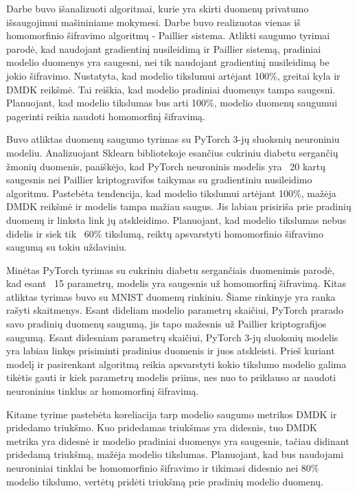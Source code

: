 \documentclass{VUMIFInfBakalaurinis}
\begin{document}
\par Darbe buvo išanalizuoti algoritmai, kurie yra skirti duomenų privatumo išsaugojimui mašininiame mokymesi.  Darbe buvo realizuotas vienas iš homomorfinio šifravimo algoritmų - Paillier sistema. Atlikti saugumo tyrimai parodė, kad naudojant gradientinį nusileidimą ir Paillier sistemą, pradiniai modelio duomenys yra saugesni, nei tik naudojant gradientinį nusileidimą be jokio šifravimo. Nustatyta, kad modelio tikslumui artėjant 100\%, greitai kyla ir DMDK reikšmė. Tai reiškia, kad modelio pradiniai duomenys tampa saugesni. Planuojant, kad modelio tikslumas bus arti 100\%, modelio duomenų saugumui pagerinti reikia naudoti homomorfinį šifravimą.
\par Buvo atliktas duomenų saugumo tyrimas su PyTorch 3-jų sluoksnių neuroniniu modeliu. Analizuojant Sklearn bibliotekoje esančius cukriniu diabetu sergančių žmonių duomenis, paaiškėjo, kad PyTorch neuroninis modelis yra ~20 kartų saugesnis nei Paillier kriptogravifos taikymas su gradientiniu nusileidimo algoritmu. Pastebėta tendencija, kad modelio tikslumui artėjant 100\%, mažėja DMDK reikšmė ir modelis tampa mažiau saugus. Jis labiau prisiriša prie pradinių duomenų ir linksta link jų atskleidimo. Planuojant, kad modelio tikslumas nebus didelis ir siek tik ~60\% tikslumą, reiktų apsvarstyti homomorfinio šifravimo saugumą su tokiu uždaviniu.
\par Minėtas PyTorch tyrimas su cukriniu diabetu sergančiais duomenimis parodė, kad esant ~15 parametrų, modelis yra saugesnis už homomorfinį šifravimą. Kitas atliktas tyrimas buvo su MNIST duomenų rinkiniu. Šiame rinkinyje yra ranka rašyti skaitmenys. Esant dideliam modelio parametrų skaičiui, PyTorch prarado savo pradinių duomenų saugumą, jis tapo mažesnis už Paillier kriptografijos saugumą. Esant didesniam parametrų skaičiui, PyTorch 3-jų sluoksnių modelis yra labiau linkęs prisiminti pradinius duomenis ir juos atskleisti. Prieš kuriant modelį ir pasirenkant algoritmą reikia apsvarstyti kokio tikslumo modelio galima tikėtis gauti ir kiek parametrų modelis priims, nes nuo to priklauso ar naudoti neuroninius tinklus ar homomorfinį šifravimą.
\par Kitame tyrime pastebėta koreliacija tarp modelio saugumo metrikos DMDK ir pridedamo triukšmo. Kuo pridedamas triukšmas yra didesnis, tuo DMDK metrika yra didesnė ir modelio pradiniai duomenys yra saugesnis, tačiau didinant pridedamą triukšmą, mažėja modelio tikslumas. Planuojant, kad bus naudojami neuroniniai tinklai be homomorfinio šifravimo ir tikimasi didesnio nei 80\% modelio tikslumo, vertėtų pridėti triukšmą prie pradinių modelio duomenų.



\end{document}
